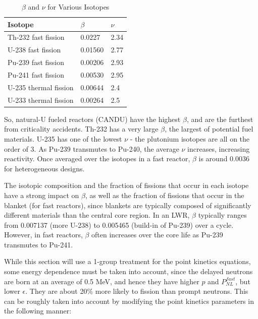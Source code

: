 \documentclass[10pt]{article}
\begin{document}
\begin{flushleft}
\begin{table}[h] 
\caption{\(\beta\) and \(\nu\) for Various Isotopes} %
\centering %
\begin{tabular}{l l l} %
\hline\hline %
 Isotope & \(\beta\) & \(\nu\)
\\ [0.5ex]
\hline %
Th-232 fast fission & 0.0227 & 2.34\\
U-238 fast fission & 0.01560 & 2.77\\
Pu-239 fast fission & 0.00206 & 2.93\\
Pu-241 fast fission & 0.00530 & 2.95\\
U-235 thermal fission & 0.00644 & 2.4\\
U-233 thermal fission & 0.00264 & 2.5\\
\hline %
\end{tabular}
\label{tab:PPer}
\end{table}

So, natural-U fueled reactors (CANDU) have the highest \(\beta\), and are the furthest from criticality accidents. Th-232 has a very large \(\beta\), the largest of potential fuel materials. U-235 has one of the lowest \(\nu\) - the plutonium isotopes are all on the order of 3. As Pu-239 transmutes to Pu-240, the average \(\nu\) increases, increasing reactivity. Once averaged over the isotopes in a fast reactor, \(\beta\) is around 0.0036 for heterogeneous designs.

The isotopic composition and the fraction of fissions that occur in each isotope have a strong impact on \(\beta\), as well as the fraction of fissions that occur in the blanket (for fast reactors), since blankets are typically composed of significantly different materials than the central core region.  In an LWR, \(\beta\) typically ranges from 0.007137 (more U-238) to 0.005465 (build-in of Pu-239) over a cycle. However, in fast reactors, \(\beta\) often increases over the core life as Pu-239 transmutes to Pu-241.

While this section will use a 1-group treatment for the point kinetics equations, some energy dependence must be taken into account, since the delayed neutrons are born at an average of 0.5 MeV, and hence they have higher \(p\) and \(P_{NL}^{fast}\), but lower \(\epsilon\). They are about 20\% more likely to fission than prompt neutrons. This can be roughly taken into account by modifying the point kinetics parameters in the following manner:


\end{flushleft}
\end{document}
